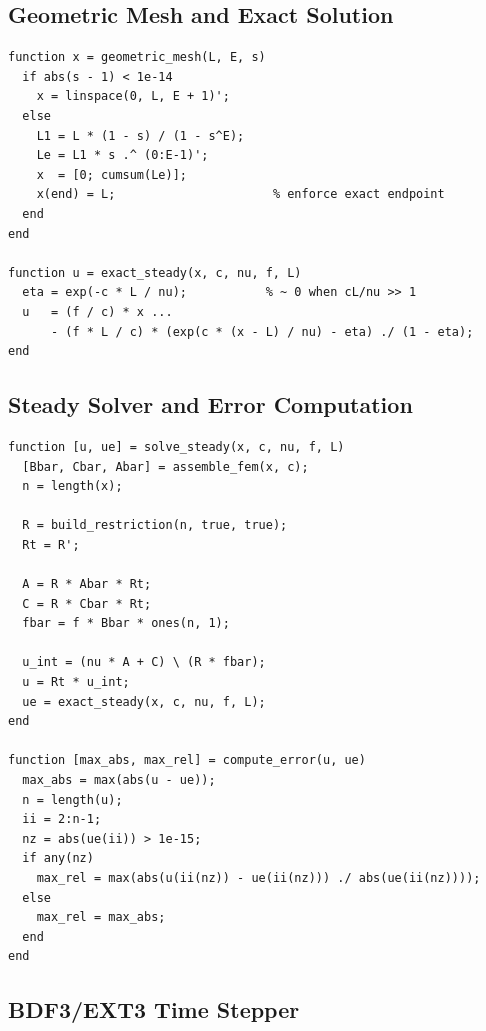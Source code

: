 \documentclass[11pt]{article}
\begin{document}
\subsection{Geometric Mesh and Exact Solution}

\begin{lstlisting}[caption={Geometric mesh and exact steady solution.}]
function x = geometric_mesh(L, E, s)
  if abs(s - 1) < 1e-14
    x = linspace(0, L, E + 1)';
  else
    L1 = L * (1 - s) / (1 - s^E);
    Le = L1 * s .^ (0:E-1)';
    x  = [0; cumsum(Le)];
    x(end) = L;                      % enforce exact endpoint
  end
end

function u = exact_steady(x, c, nu, f, L)
  eta = exp(-c * L / nu);           % ~ 0 when cL/nu >> 1
  u   = (f / c) * x ...
      - (f * L / c) * (exp(c * (x - L) / nu) - eta) ./ (1 - eta);
end
\end{lstlisting}

\subsection{Steady Solver and Error Computation}

\begin{lstlisting}[caption={Steady solver and error metrics.}]
function [u, ue] = solve_steady(x, c, nu, f, L)
  [Bbar, Cbar, Abar] = assemble_fem(x, c);
  n = length(x);

  R = build_restriction(n, true, true);
  Rt = R';

  A = R * Abar * Rt;
  C = R * Cbar * Rt;
  fbar = f * Bbar * ones(n, 1);

  u_int = (nu * A + C) \ (R * fbar);
  u = Rt * u_int;
  ue = exact_steady(x, c, nu, f, L);
end

function [max_abs, max_rel] = compute_error(u, ue)
  max_abs = max(abs(u - ue));
  n = length(u);
  ii = 2:n-1;
  nz = abs(ue(ii)) > 1e-15;
  if any(nz)
    max_rel = max(abs(u(ii(nz)) - ue(ii(nz))) ./ abs(ue(ii(nz))));
  else
    max_rel = max_abs;
  end
end
\end{lstlisting}

\subsection{BDF3/EXT3 Time Stepper}
\end{document}
